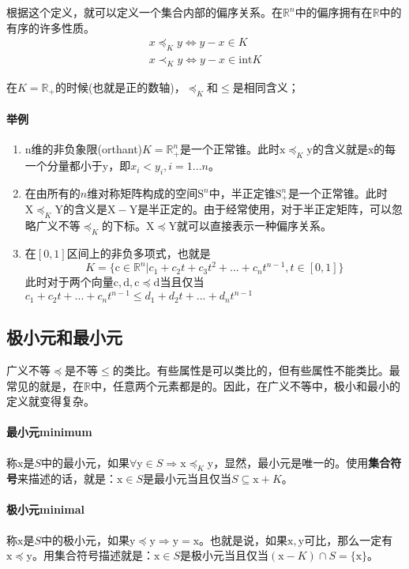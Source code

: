 \documentclass[a4paper]{D:/MyRepo/Script/latex/PaperReadingLog}
\begin{document}
根据这个定义，就可以定义一个集合内部的偏序关系。在$\mathbb{R}^n$中的偏序拥有在$\mathbb{R}$中的有序的许多性质。
$$
\begin{aligned}
    x\preceq_K y \Leftrightarrow y-x\in K\\
    x\prec_K y\Leftrightarrow y-x\in \mathrm{int}K
\end{aligned}
$$

在$K=\mathbb{R}_+$的时候(也就是正的数轴)，$\preceq_K$和$\le$是相同含义；

\paragraph{举例}
\begin{enumerate}
    \item n维的非负象限(orthant)$K=\mathbb{R}_+^n$是一个正常锥。此时$\mathrm{x}\preceq_K \mathrm{y}$的含义就是$\mathrm{x}$的每一个分量都小于$\mathrm{y}$，即$x_i<y_i,i=1...n$。
    \item 在由所有的$n$维对称矩阵构成的空间$\mathrm{S}^n$中，半正定锥$\mathrm{S}_+^n$是一个正常锥。此时$\mathrm{X}\preceq_K\mathrm{Y}$的含义是$\mathrm{X}-\mathrm{Y}$是半正定的。由于经常使用，对于半正定矩阵，可以忽略广义不等$\preceq_K$的下标。$\mathrm{X}\preceq\mathrm{Y}$就可以直接表示一种偏序关系。
    \item 在$[0,1]$区间上的非负多项式，也就是
    $$
    K=\{\mathrm{c}\in\mathbb{R}^n|c_1+c_2t+c_3t^2+...+c_nt^{n-1},t\in[0,1]\}
    $$此时对于两个向量$\mathrm{c},\mathrm{d},\mathrm{c}\preceq\mathrm{d}$当且仅当$c_1+c_2t+...+c_nt^{n-1}\le d_1+d_2t+...+d_nt^{n-1}$
\end{enumerate}

\subsection{极小元和最小元}
广义不等$\preceq$是不等$\le$的类比。有些属性是可以类比的，但有些属性不能类比。最常见的就是，在$\mathbb{R}$中，任意两个元素都是的。因此，在广义不等中，极小和最小的定义就变得复杂。

\paragraph{最小元minimum} 称$\mathrm{x}$是$S$中的最小元，如果$\forall \mathrm{y}\in S\Rightarrow \mathrm{x}\preceq_K \mathrm{y}$，显然，最小元是唯一的。使用\textbf{集合符号}来描述的话，就是：$\mathrm{x}\in S$是最小元当且仅当$S\subseteq \mathrm{x}+K$。

\paragraph{极小元minimal} 称$\mathrm{x}$是$S$中的极小元，如果$\mathrm{y}\preceq\mathrm{y} \Rightarrow \mathrm{y}=\mathrm{x}$。也就是说，如果$\mathrm{x},\mathrm{y}$可比，那么一定有$\mathrm{x}\preceq\mathrm{y}$。用集合符号描述就是：$\mathrm{x}\in S$是极小元当且仅当$(\mathrm{x}-K)\cap S=\{\mathrm{x}\}$。
\end{document}
